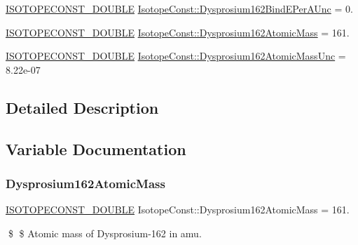 \begin{DoxyCompactItemize}
\item 
\mbox{\hyperlink{group___isotope_const-_macros_ga8f45a7272ce02c0b4c65c44636ed719a}{I\+S\+O\+T\+O\+P\+E\+C\+O\+N\+S\+T\+\_\+\+D\+O\+U\+B\+LE}} \mbox{\hyperlink{group___isotope_const-_dysprosium-_dy162_gaea4fe50130e3e9b8ce70263f6f1ac41e}{Isotope\+Const\+::\+Dysprosium162\+Bind\+E\+Per\+A\+Unc}} = 0.
\item 
\mbox{\hyperlink{group___isotope_const-_macros_ga8f45a7272ce02c0b4c65c44636ed719a}{I\+S\+O\+T\+O\+P\+E\+C\+O\+N\+S\+T\+\_\+\+D\+O\+U\+B\+LE}} \mbox{\hyperlink{group___isotope_const-_dysprosium-_dy162_gad2b28bf8f9d6cc63438f4a3efd032790}{Isotope\+Const\+::\+Dysprosium162\+Atomic\+Mass}} = 161.
\item 
\mbox{\hyperlink{group___isotope_const-_macros_ga8f45a7272ce02c0b4c65c44636ed719a}{I\+S\+O\+T\+O\+P\+E\+C\+O\+N\+S\+T\+\_\+\+D\+O\+U\+B\+LE}} \mbox{\hyperlink{group___isotope_const-_dysprosium-_dy162_gae46e51c7e4b07192b2c4df03ff6f9966}{Isotope\+Const\+::\+Dysprosium162\+Atomic\+Mass\+Unc}} = 8.\+22e-\/07
\end{DoxyCompactItemize}


\subsection{Detailed Description}


\subsection{Variable Documentation}
\mbox{\label{group___isotope_const-_dysprosium-_dy162_gad2b28bf8f9d6cc63438f4a3efd032790}} 
\subsubsection{\texorpdfstring{Dysprosium162\+Atomic\+Mass}{Dysprosium162AtomicMass}}
{\footnotesize\ttfamily \mbox{\hyperlink{group___isotope_const-_macros_ga8f45a7272ce02c0b4c65c44636ed719a}{I\+S\+O\+T\+O\+P\+E\+C\+O\+N\+S\+T\+\_\+\+D\+O\+U\+B\+LE}} Isotope\+Const\+::\+Dysprosium162\+Atomic\+Mass = 161.}

\$ \$ Atomic mass of Dysprosium-\/162 in amu. \mbox{\label{group___isotope_const-_dysprosium-_dy162_gae46e51c7e4b07192b2c4df03ff6f9966}} 
